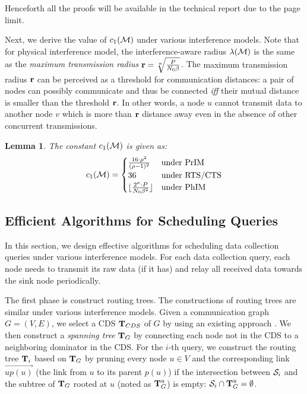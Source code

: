 \documentclass[conference,10pt]{IEEEtran}\usepackage{amsmath}
\newtheorem{lemma}{{Lemma}}
\def\sources{{\cal S}}
\def\actree{{\textbf T}}
\def\maxlink{\textbf r}
\def\pathloss{{\kappa}}
\def\regionlenth{{\lambda}}
\begin{document}
Henceforth all the proofs will be available in the
technical report \cite{xu-technical-globecom} due to the page limit.

Next, we derive the value of $c_1({\cal M})$ under various
interference models.
Note that for physical interference model,
 the interference-aware radius
$\regionlenth({\cal M})$ is the same as the \emph{maximum transmission
radius} $\maxlink = \sqrt[\pathloss]{\frac{P}{N_0\beta}}$.
The {maximum transmission
radius $\maxlink$} can be perceived as a threshold for communication distances:
a pair of nodes can possibly communicate and thus be
connected \emph{iff} their mutual distance is smaller than the threshold $\maxlink$.
In other words, a node $u$ cannot transmit data to another node $v$
 which is more than $\maxlink$ distance away
 even in the absence of other concurrent transmissions.

\begin{lemma}
\label{lem:c_1_pro}
The constant $c_1({\cal M})$ is given as:
\begin{equation*}c_1({\cal M})=
\begin{cases}
\frac{16\cdot \rho^2}{(\rho-1)^2} & \text{under PrIM}\\
36   &    \text{under RTS/CTS}\\
\lfloor\frac{2^\pathloss \cdot P}{N_0 \beta^2}\rfloor &  \text{under PhIM}
\end{cases}
\end{equation*}
\end{lemma}


\subsection{Efficient Algorithms for Scheduling Queries}\label{sec:col_alg}
In this section, we design effective algorithms for scheduling data
collection queries under various interference models.
For each data collection query, each node needs to transmit its raw data (if it has) and relay all
received data towards the sink node periodically.



The first phase is construct routing trees.
The constructions of routing trees
 are similar under various interference models.
Given a communication graph $G=(V,E)$, we select
 a CDS $\actree_{CDS}$ of $G$ by using an existing approach
 \cite{wan2002infocom}.
We then construct a \emph{spanning tree} $\actree_G$ by connecting
 each node not in the CDS to a neighboring dominator in the CDS.
For the $i$-th query, we construct the routing tree $\actree_i$ based on $\actree_G$ by
 pruning every node $u\in V$ and the corresponding link
 $\overrightarrow{up(u)}$ (the link from $u$ to its parent $p(u)$)
 if the intersection between $\sources_i$ and the subtree of $\actree_{G}$ rooted
 at $u$ (noted as $\actree^u_G$) is empty: $\sources_i\cap
 \actree^u_G=\emptyset$.
\end{document}
